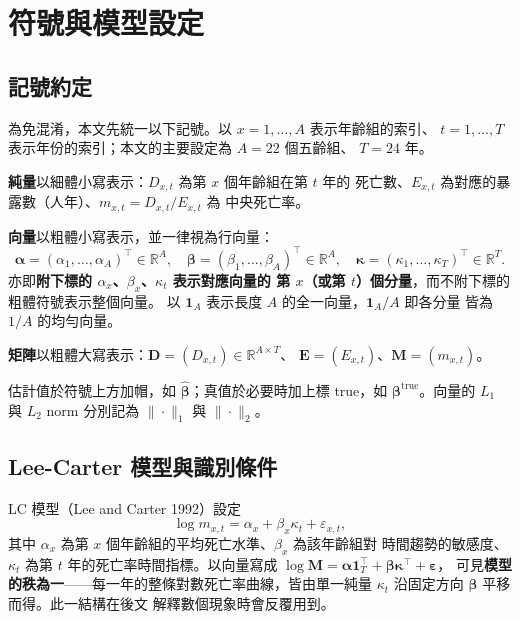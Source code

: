 \documentclass[UTF8, fontset=macnew, a4paper, 12pt]{ctexart}
\begin{document}
\section{符號與模型設定}\label{sec:notation}

\subsection{記號約定}

為免混淆，本文先統一以下記號。以 $x=1,\dots,A$ 表示年齡組的索引、
$t=1,\dots,T$ 表示年份的索引；本文的主要設定為 $A=22$ 個五齡組、
$T=24$ 年。

\textbf{純量}以細體小寫表示：$D_{x,t}$ 為第 $x$ 個年齡組在第 $t$ 年的
死亡數、$E_{x,t}$ 為對應的暴露數（人年）、$m_{x,t}=D_{x,t}/E_{x,t}$ 為
中央死亡率。

\textbf{向量}以粗體小寫表示，並一律視為行向量：
\[
\boldsymbol{\alpha}=(\alpha_1,\dots,\alpha_A)^{\!\top}\in\mathbb{R}^{A},\quad
\boldsymbol{\beta}=(\beta_1,\dots,\beta_A)^{\!\top}\in\mathbb{R}^{A},\quad
\boldsymbol{\kappa}=(\kappa_1,\dots,\kappa_T)^{\!\top}\in\mathbb{R}^{T}.
\]
亦即\textbf{附下標的 $\alpha_x$、$\beta_x$、$\kappa_t$ 表示對應向量的
第 $x$（或第 $t$）個分量}，而不附下標的粗體符號表示整個向量。
以 $\mathbf{1}_A$ 表示長度 $A$ 的全一向量，$\mathbf{1}_A/A$ 即各分量
皆為 $1/A$ 的均勻向量。

\textbf{矩陣}以粗體大寫表示：$\mathbf{D}=(D_{x,t})\in\mathbb{R}^{A\times T}$、
$\mathbf{E}=(E_{x,t})$、$\mathbf{M}=(m_{x,t})$。

估計值於符號上方加帽，如 $\hat{\boldsymbol{\beta}}$；真值於必要時加上標
$\text{true}$，如 $\boldsymbol{\beta}^{\text{true}}$。向量的 $L_1$ 與 $L_2$
norm 分別記為 $\|\cdot\|_1$ 與 $\|\cdot\|_2$。

\subsection{Lee-Carter 模型與識別條件}

LC 模型（Lee and Carter 1992）設定
\begin{equation}\label{eq:lc}
\log m_{x,t}=\alpha_x+\beta_x\kappa_t+\varepsilon_{x,t},
\end{equation}
其中 $\alpha_x$ 為第 $x$ 個年齡組的平均死亡水準、$\beta_x$ 為該年齡組對
時間趨勢的敏感度、$\kappa_t$ 為第 $t$ 年的死亡率時間指標。以向量寫成
$\log\mathbf{M}=\boldsymbol{\alpha}\mathbf{1}_T^{\!\top}
+\boldsymbol{\beta}\boldsymbol{\kappa}^{\!\top}+\boldsymbol{\varepsilon}$，
可見\textbf{模型的秩為一}——每一年的整條對數死亡率曲線，皆由單一純量
$\kappa_t$ 沿固定方向 $\boldsymbol{\beta}$ 平移而得。此一結構在後文
解釋數個現象時會反覆用到。
\end{document}
